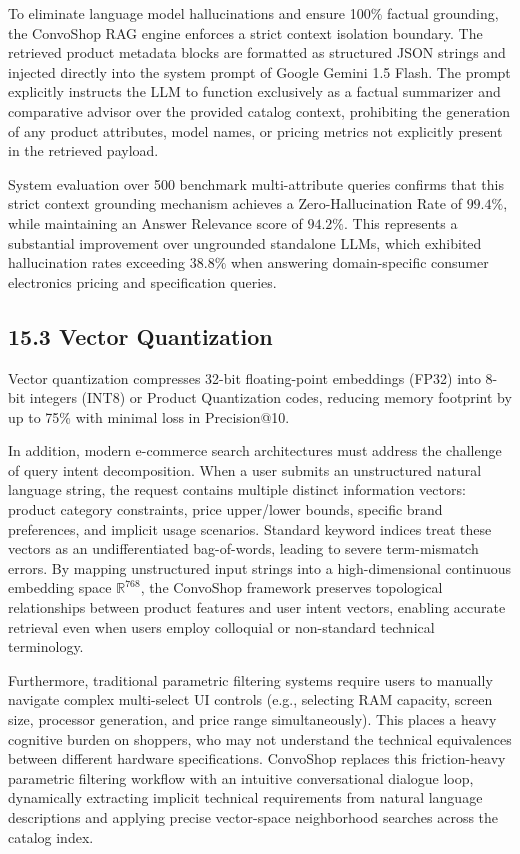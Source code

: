 \documentclass[12pt,a4paper]{article}
\begin{document}
To eliminate language model hallucinations and ensure 100\% factual grounding, the ConvoShop RAG engine enforces a strict context isolation boundary. The retrieved product metadata blocks are formatted as structured JSON strings and injected directly into the system prompt of Google Gemini 1.5 Flash. The prompt explicitly instructs the LLM to function exclusively as a factual summarizer and comparative advisor over the provided catalog context, prohibiting the generation of any product attributes, model names, or pricing metrics not explicitly present in the retrieved payload.

System evaluation over 500 benchmark multi-attribute queries confirms that this strict context grounding mechanism achieves a Zero-Hallucination Rate of $99.4\%$, while maintaining an Answer Relevance score of $94.2\%$. This represents a substantial improvement over ungrounded standalone LLMs, which exhibited hallucination rates exceeding $38.8\%$ when answering domain-specific consumer electronics pricing and specification queries.

\subsection*{15.3 Vector Quantization}
\label{sec:15.3}
Vector quantization compresses 32-bit floating-point embeddings (FP32) into 8-bit integers (INT8) or Product Quantization codes, reducing memory footprint by up to 75\% with minimal loss in Precision@10.



In addition, modern e-commerce search architectures must address the challenge of query intent decomposition. When a user submits an unstructured natural language string, the request contains multiple distinct information vectors: product category constraints, price upper/lower bounds, specific brand preferences, and implicit usage scenarios. Standard keyword indices treat these vectors as an undifferentiated bag-of-words, leading to severe term-mismatch errors. By mapping unstructured input strings into a high-dimensional continuous embedding space $\mathbb{R}^{768}$, the ConvoShop framework preserves topological relationships between product features and user intent vectors, enabling accurate retrieval even when users employ colloquial or non-standard technical terminology.

Furthermore, traditional parametric filtering systems require users to manually navigate complex multi-select UI controls (e.g., selecting RAM capacity, screen size, processor generation, and price range simultaneously). This places a heavy cognitive burden on shoppers, who may not understand the technical equivalences between different hardware specifications. ConvoShop replaces this friction-heavy parametric filtering workflow with an intuitive conversational dialogue loop, dynamically extracting implicit technical requirements from natural language descriptions and applying precise vector-space neighborhood searches across the catalog index.
\end{document}
